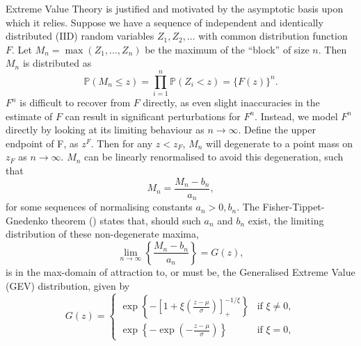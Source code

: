 \documentclass{article}
\numberwithin{equation}{section}
\begin{document}
Extreme Value Theory is justified and motivated by the asymptotic basis upon which it relies.
Suppose we have a sequence of independent and identically distributed (IID) random variables $Z_1, Z_2, \ldots$ with common distribution function $F$. 
Let $M_n = \max(Z_1, \ldots, Z_n)$ be the maximum of the ``block'' of size $n$.
Then $M_n$ is distributed as
\[
  \mathbb{P}(M_n \le z) = \prod_{i = 1}^{n}{\mathbb{P}(Z_i < z)} = \{F(z)\}^n.
\]
$F^n$ is difficult to recover from $F$ directly, as even slight inaccuracies in the estimate of $F$ can result in significant perturbations for $F^n$.
Instead, we model $F^n$ directly by looking at its limiting behaviour as $n \to \infty$.
Define the upper endpoint of F, as $z^F$. %
Then for any $z < z_F$, $M_n$ will degenerate to a point mass on $z_F$ as $n \to \infty$.
$M_n$ can be linearly renormalised to avoid this degeneration, such that
\[
  M_n = \frac{M_n - b_n}{a_n},
\]
for some sequences of normalising constants $a_n > 0, b_n$. 
The Fisher-Tippet-Gnedenko theorem (\cite{Fisher1928, Gnedenko1943}) states that, should such $a_n$ and $b_n$ exist, the limiting distribution of these non-degenerate maxima,
\begin{equation} \label{eq:uni_limiting_dist}
  \lim_{n \to \infty}\left\{\frac{M_n - b_n}{a_n}\right\} = G(z),
\end{equation}
is in the max-domain of attraction to, or must be, the Generalised Extreme Value (GEV) distribution, given by 
\begin{equation} \label{eq:gev}
  G(z) = \begin{cases}
    \exp\left\{-\left[1 + \xi\left(\frac{z - \mu}{\sigma}\right)\right]_+^{-1/\xi}\right\} & \text{if } \xi \ne 0, \\
    \exp\left\{-\exp\left(-\frac{z - \mu}{\sigma}\right)\right\} & \text{if } \xi = 0,
  \end{cases}
\end{equation}
\end{document}
